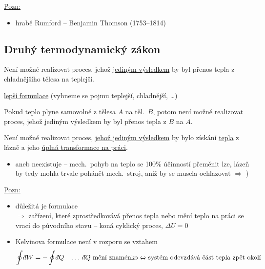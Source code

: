 \medskip
\underline{Pozn:}
\begin{itemize}[nosep]
  \item hrabě Rumford -- Benjamin Thomson (1753--1814)
\end{itemize}

\subsection*{Druhý termodynamický zákon}

\begin{veta}[Clausius]
Není možné realizovat proces, jehož \underline{jediným výsledkem} by byl přenos tepla z chladnějšího tělesa na teplejší.
\end{veta}

\underline{lepší formulace} (vyhneme se pojmu teplejší, chladnější, \dots)
\begin{veta}
Pokud teplo plyne samovolně z tělesa $A$ na těl.\ $B$, potom není možné realizovat proces, jehož jediným výsledkem by byl přenos tepla z $B$ na $A$.
\end{veta}

\begin{veta}[Kelvin]
Není možné realizovat proces, \underline{jehož jediným výsledkem} by bylo získání \underline{tepla} z lázně a jeho \underline{úplná transformace na práci}.
\end{veta}

\begin{itemize}
  \item aneb neexistuje  -- mech.\ pohyb na teplo se 100\% účinností přeměnit lze, lázeň by tedy mohla trvale pohánět mech.\ stroj, aniž by se musela ochlazovat $\Rightarrow$ )
\end{itemize}

\underline{Pozn:}
\begin{itemize}
  \item důležitá je formulace \underline{} \\
        $\Rightarrow$ zařízení, které zprostředkovává přenos tepla nebo mění teplo na práci se vrací do původního stavu -- koná cyklický proces, $\Delta U = 0$
  \item Kelvinova formulace není v rozporu se vztahem
  \[
    \oint\dbar W = -\oint\dbar Q \quad\dots\ \dbar Q \text{ mění znaménko} \Leftrightarrow \text{systém odevzdává část tepla zpět okolí}
  \]
\end{itemize}

